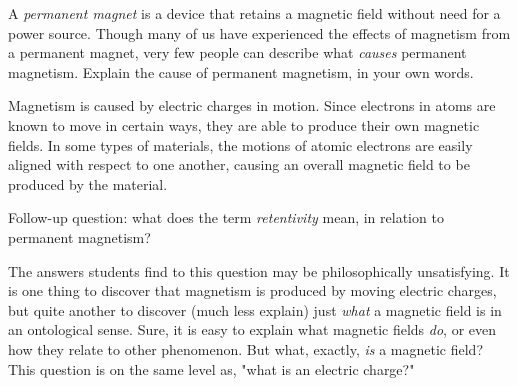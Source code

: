 

A {\it permanent magnet} is a device that retains a magnetic field without need for a power source.  Though many of us have experienced the effects of magnetism from a permanent magnet, very few people can describe what {\it causes} permanent magnetism.  Explain the cause of permanent magnetism, in your own words.







Magnetism is caused by electric charges in motion.  Since electrons in atoms are known to move in certain ways, they are able to produce their own magnetic fields.  In some types of materials, the motions of atomic electrons are easily aligned with respect to one another, causing an overall magnetic field to be produced by the material.

\vskip 10pt

Follow-up question: what does the term {\it retentivity} mean, in relation to permanent magnetism?







The answers students find to this question may be philosophically unsatisfying.  It is one thing to discover that magnetism is produced by moving electric charges, but quite another to discover (much less explain) just {\it what} a magnetic field is in an ontological sense.  Sure, it is easy to explain what magnetic fields {\it do}, or even how they relate to other phenomenon.  But what, exactly, {\it is} a magnetic field?  This question is on the same level as, "what is an electric charge?"




